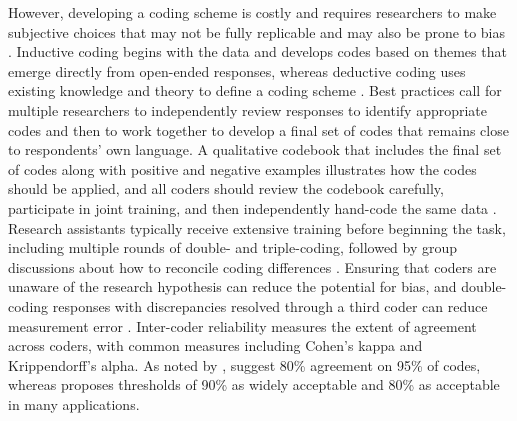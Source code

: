 \documentclass[11pt]{article}
\begin{document}
\begin{sloppypar}
However, developing a coding scheme is costly and requires researchers to make subjective choices that may not be fully replicable and may also be prone to bias \citep{haaland2025understanding}. Inductive coding begins with the data and develops codes based on themes that emerge directly from open-ended responses, whereas deductive coding uses existing knowledge and theory to define a coding scheme \citep{haaland2025understanding}. Best practices call for multiple researchers to independently review responses to identify appropriate codes and then to work together to develop a final set of codes that remains close to respondents’ own language. A qualitative codebook that includes the final set of codes along with positive and negative examples illustrates how the codes should be applied, and all coders should review the codebook carefully, participate in joint training, and then independently hand-code the same data \citep{ChopraHaaland2023}. Research assistants typically receive extensive training before beginning the task, including multiple rounds of double- and triple-coding, followed by group discussions about how to reconcile coding differences \citep{ChopraHaaland2023}. Ensuring that coders are unaware of the research hypothesis can reduce the potential for bias, and double-coding responses with discrepancies resolved through a third coder can reduce measurement error \citep{haaland2025understanding}. Inter-coder reliability measures the extent of agreement across coders, with common measures including Cohen's kappa and Krippendorff's alpha. As noted by \citet{haaland2025understanding}, \citet{miles1994qualitative} suggest 80\% agreement on 95\% of codes, whereas \citet{neuendorf2017content} proposes thresholds of 90\% as widely acceptable and 80\% as acceptable in many applications.


\end{sloppypar}
\end{document}
